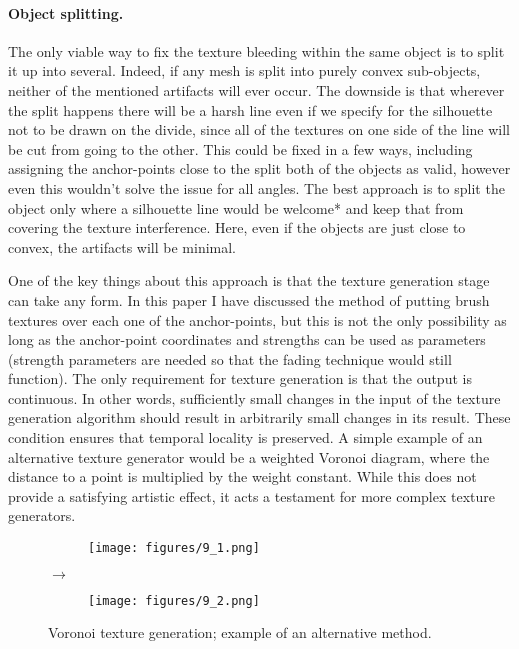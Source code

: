 \documentclass[a4paper, 12pt]{article}
\begin{document}
\paragraph{Object splitting.}
The only viable way to fix the texture bleeding within the same object is to split it up into several. Indeed, if any mesh is split into purely convex sub-objects, neither of the mentioned artifacts will ever occur. The downside is that wherever the split happens there will be a harsh line even if we specify for the silhouette not to be drawn on the divide, since all of the textures on one side of the line will be cut from going to the other. This could be fixed in a few ways, including assigning the anchor-points close to the split both of the objects as valid, however even this wouldn't solve the issue for all angles. The best approach is to split the object only where a silhouette line would be welcome* and keep that from covering the texture interference. Here, even if the objects are just close to convex, the artifacts will be minimal.

One of the key things about this approach is that the texture generation stage can take any form. In this paper I have discussed the method of putting brush textures over each one of the anchor-points, but this is not the only possibility as long as the anchor-point coordinates and strengths can be used as parameters (strength parameters are needed so that the fading technique would still function). The only requirement for texture generation is that the output is continuous. In other words, sufficiently small changes in the input of the texture generation algorithm should result in arbitrarily small changes in its result. These condition ensures that temporal locality is preserved. A simple example of an alternative texture generator would be a weighted Voronoi diagram, where the distance to a point is multiplied by the weight constant. While this does not provide a satisfying artistic effect, it acts a testament for more complex texture generators.

\begin{figure}
  \centering
  \begin{subfigure}{0.2\columnwidth}
    \texttt{[image: figures/9\_1.png]}
  \end{subfigure}%
  $\bm{\rightarrow}$%
  \begin{subfigure}{0.2\columnwidth}
    \texttt{[image: figures/9\_2.png]}
  \end{subfigure}
  \caption{Voronoi texture generation; example of an alternative method.}
\end{figure}
\end{document}
